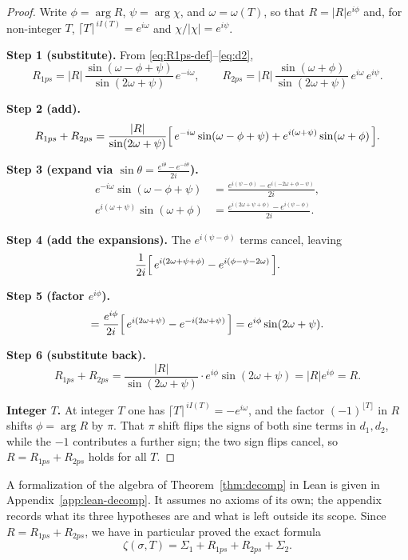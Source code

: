 \documentclass[11pt]{article}
\theoremstyle{definition}
\begin{document}
\begin{proof}
Write $\phi = \arg R$, $\psi = \arg\chi$, and $\omega=\omega(T)$, so that
$R=|R|e^{i\phi}$ and, for non-integer $T$, $\lceil T\rceil^{\,iI(T)}=e^{i\omega}$
and $\chi/|\chi|=e^{i\psi}$.

\smallskip
\noindent\textbf{Step 1 (substitute).} From \eqref{eq:R1ps-def}--\eqref{eq:d2},
\[
R_{1ps} = |R|\,\frac{\sin(\omega - \phi + \psi)}{\sin(2\omega + \psi)}\, e^{-i\omega},
\qquad
R_{2ps} = |R|\,\frac{\sin(\omega + \phi)}{\sin(2\omega + \psi)}\, e^{i\omega}\, e^{i\psi}.
\]

\noindent\textbf{Step 2 (add).}
\[
R_{1ps} + R_{2ps}
= \frac{|R|}{\sin(2\omega + \psi)}
\Bigl[\, e^{-i\omega}\sin(\omega - \phi + \psi) + e^{i(\omega + \psi)}\sin(\omega + \phi)\,\Bigr].
\]

\noindent\textbf{Step 3 (expand via $\sin\theta = \tfrac{e^{i\theta}-e^{-i\theta}}{2i}$).}
\begin{align*}
e^{-i\omega}\sin(\omega - \phi + \psi)
&= \frac{e^{i(\psi - \phi)} - e^{i(-2\omega + \phi - \psi)}}{2i}, \\
e^{i(\omega + \psi)}\sin(\omega + \phi)
&= \frac{e^{i(2\omega + \psi + \phi)} - e^{i(\psi - \phi)}}{2i}.
\end{align*}

\noindent\textbf{Step 4 (add the expansions).} The $e^{i(\psi-\phi)}$ terms
cancel, leaving
\[
\frac{1}{2i}\Bigl[\, e^{i(2\omega + \psi + \phi)} - e^{i(\phi - \psi - 2\omega)}\,\Bigr].
\]

\noindent\textbf{Step 5 (factor $e^{i\phi}$).}
\[
= \frac{e^{i\phi}}{2i}\Bigl[\, e^{i(2\omega + \psi)} - e^{-i(2\omega + \psi)}\,\Bigr]
= e^{i\phi}\sin(2\omega + \psi).
\]

\noindent\textbf{Step 6 (substitute back).}
\[
R_{1ps} + R_{2ps}
= \frac{|R|}{\sin(2\omega + \psi)}\cdot e^{i\phi}\sin(2\omega + \psi)
= |R|e^{i\phi} = R.
\]

\smallskip
\noindent\textbf{Integer $T$.} At integer $T$ one has
$\lceil T\rceil^{\,iI(T)} = -e^{i\omega}$, and the factor $(-1)^{\lfloor T\rfloor}$
in $R$ shifts $\phi=\arg R$ by $\pi$. That $\pi$ shift flips the signs of both
sine terms in $d_1,d_2$, while the $-1$ contributes a further sign; the two sign
flips cancel, so $R = R_{1ps}+R_{2ps}$ holds for all $T$.
\end{proof}

A formalization of the algebra of Theorem~\ref{thm:decomp} in Lean is given in
Appendix~\ref{app:lean-decomp}. It assumes no axioms of its own; the appendix
records what its three hypotheses are and what is left outside its scope.
Since $R=R_{1ps}+R_{2ps}$, we have in particular proved the exact formula
\begin{equation}\label{eq:zeta-ps}
\zeta(\sigma,T)
=
\Sigma_{1} + R_{1ps} + R_{2ps} + \Sigma_{2}.
\end{equation}
\end{document}
